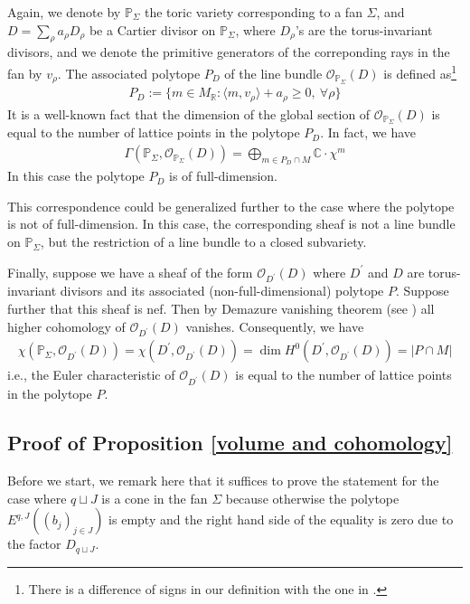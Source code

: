 \documentclass[11pt,reqno]{amsart}
\def\CC {{\mathbb C}}
\def\R {{\mathbb R}}
\def\PP {{\mathbb P}}
\theoremstyle{definition}
\numberwithin{equation}{section}
\begin{document}
\smallskip

Again, we denote by $\PP_{\Sigma}$ the toric variety corresponding to a fan $\Sigma$, and $D=\sum_{\rho}a_{\rho}D_{\rho}$ be a Cartier divisor on $\PP_{\Sigma}$, where $D_{\rho}$'s are the torus-invariant divisors, and we denote the primitive generators of the correponding rays in the fan by $v_{\rho}$. The associated polytope $P_D$ of the line bundle $\mathcal{O}_{\PP_{\Sigma}}(D)$ is defined as\footnote{There is a difference of signs in our definition with the one in \cite{Cox}.}
\begin{align*}
	P_D:=\{m\in M_{\R}: \langle m, v_{\rho}\rangle  +a_{\rho}\geq 0,\ \forall\rho\}
\end{align*}
It is a well-known fact that the dimension of the global section of $\mathcal{O}_{\PP_{\Sigma}}(D)$ is equal to the number of lattice points in the polytope $P_D$. In fact, we have
\begin{align*}
	\Gamma(\PP_{\Sigma},\mathcal{O}_{\PP_{\Sigma}}(D))=\bigoplus_{m\in P_D\cap M}\CC\cdot\chi^m
\end{align*}
In this case the polytope $P_D$ is of full-dimension.

\smallskip

This correspondence could be generalized further to the case where the polytope is not of full-dimension. In this case, the corresponding sheaf is not a line bundle on $\PP_{\Sigma}$, but the restriction of a line bundle to a closed subvariety.

\smallskip

Finally, suppose we have a sheaf of the form $\mathcal{O}_{D^{\prime}}(D)$ where $D^{\prime}$ and $D$ are torus-invariant divisors and its associated (non-full-dimensional) polytope $P$. Suppose further that this sheaf is nef. Then by Demazure vanishing theorem (see \cite[Theorem 9.2.3]{Cox}) all higher cohomology of $\mathcal{O}_{D^{\prime}}(D)$ vanishes. Consequently, we have
\begin{align*}
	\chi(\PP_{\Sigma},\mathcal{O}_{D^{\prime}}(D))=\chi(D^{\prime},\mathcal{O}_{D^{\prime}}(D))=\dim H^0(D^{\prime},\mathcal{O}_{D^{\prime}}(D))=|P\cap M|
\end{align*}
i.e., the Euler characteristic of $\mathcal{O}_{D^{\prime}}(D)$ is equal to the number of lattice points in the polytope $P$.


\subsection{Proof of Proposition \ref{volume and cohomology}}\label{proof of the volume formula}
Before we start, we remark here that it suffices to prove the statement for the case where $q\sqcup J$ is a cone in the fan $\Sigma$ because otherwise the polytope $E^{q,J}((b_j)_{j\in J})$ is empty and the right hand side of the equality is zero due to the factor $D_{q\sqcup J}$.
\end{document}
